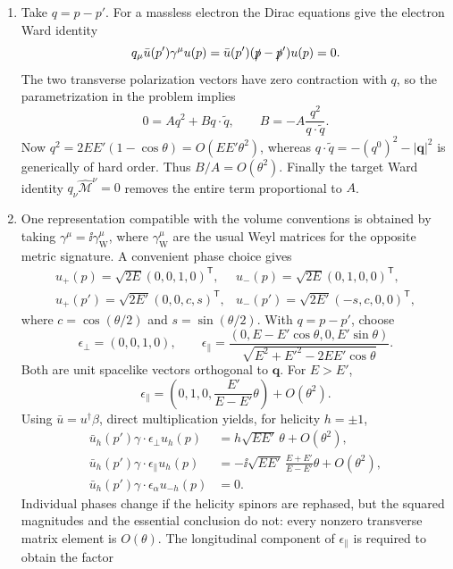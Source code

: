 \begin{enumerate}
\begin{enumerate}
\item
Take \(q=p-p'\).  For a massless electron the Dirac equations give the
electron Ward identity
\[
 q_\mu\bar u(p')\gamma^\mu u(p)
 =\bar u(p')(\slashed p-\slashed p')u(p)=0.
\]
The two transverse polarization vectors have zero contraction with
\(q\), so the parametrization in the problem implies
\[
 0=Aq^2+Bq\cdot\widetilde q,
 \qquad
 B=-A\frac{q^2}{q\cdot\widetilde q}.
\]
Now \(q^2=2EE'(1-\cos\theta)=O(EE'\theta^2)\), whereas
\(q\cdot\widetilde q=-(q^0)^2-\lvert\mathbf q\rvert^2\) is generically of
hard order.  Thus \(B/A=O(\theta^2)\).  Finally the target Ward identity
\(q_\nu\widehat{\mathcal M}^{\nu}=0\) removes the entire term
proportional to \(A\).
\item
One representation compatible with the volume conventions is obtained by
taking \(\gamma^\mu=\ii\gamma^\mu_{\mathrm W}\), where
\(\gamma^\mu_{\mathrm W}\) are the usual Weyl matrices for the opposite
metric signature.  A convenient phase choice gives
\[
 \begin{array}{ll}
 u_+(p)=\sqrt{2E}(0,0,1,0)^{\mathsf T},&
 u_-(p)=\sqrt{2E}(0,1,0,0)^{\mathsf T},\\[2mm]
 u_+(p')=\sqrt{2E'}(0,0,c,s)^{\mathsf T},&
 u_-(p')=\sqrt{2E'}(-s,c,0,0)^{\mathsf T},
 \end{array}
\]
where \(c=\cos(\theta/2)\) and \(s=\sin(\theta/2)\).  With
\(q=p-p'\), choose
\[
 \epsilon_\perp=(0,0,1,0),\qquad
 \epsilon_\parallel=
 \frac{(0,E-E'\cos\theta,0,E'\sin\theta)}
 {\sqrt{E^2+E'^2-2EE'\cos\theta}}.
\]
Both are unit spacelike vectors orthogonal to \(\mathbf q\).  For
\(E>E'\),
\[
 \epsilon_\parallel=
 \left(0,1,0,\frac{E'}{E-E'}\theta\right)+O(\theta^2).
\]
Using \(\bar u=u^\dagger\beta\), direct multiplication yields, for
helicity \(h=\pm1\),
\[
 \begin{split}
 \bar u_h(p')\gamma\cdot\epsilon_\perp u_h(p)
 &=h\sqrt{EE'}\,\theta+O(\theta^2),\\
 \bar u_h(p')\gamma\cdot\epsilon_\parallel u_h(p)
 &=-\ii\sqrt{EE'}\,\frac{E+E'}{E-E'}\theta+O(\theta^2),\\
 \bar u_h(p')\gamma\cdot\epsilon_\alpha u_{-h}(p)&=0.
 \end{split}
\]
Individual phases change if the helicity spinors are rephased, but the
squared magnitudes and the essential conclusion do not: every nonzero
transverse matrix element is \(O(\theta)\).  The longitudinal component of
\(\epsilon_\parallel\) is required to obtain the factor

\end{enumerate}
\end{enumerate}
